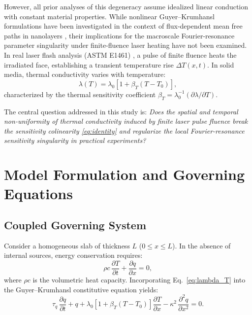 \documentclass[preprint,12pt,a4paper]{elsarticle}
\begin{document}
However, all prior analyses of this degeneracy assume idealized linear conduction with constant material properties. While nonlinear Guyer--Krumhansl formulations have been investigated in the context of flux-dependent mean free paths in nanolayers \cite{Sellitto2025}, their implications for the macroscale Fourier-resonance parameter singularity under finite-fluence laser heating have not been examined. In real laser flash analysis (ASTM E1461) \cite{ASTME1461,Cowan1963,CapeLehman1963}, a pulse of finite fluence heats the irradiated face, establishing a transient temperature rise $\Delta T(x,t)$. In solid media, thermal conductivity varies with temperature:
\begin{equation}
  \lambda(T) = \lambda_0 \left[1 + \beta_T (T - T_0)\right] ,
  \label{eq:lambda_T}
\end{equation}
characterized by the thermal sensitivity coefficient $\beta_T = \lambda_0^{-1} (\partial \lambda/\partial T)$.

The central question addressed in this study is: \emph{Does the spatial and temporal non-uniformity of thermal conductivity induced by finite laser pulse fluence break the sensitivity colinearity \eqref{eq:identity} and regularize the local Fourier-resonance sensitivity singularity in practical experiments?}

\section{Model Formulation and Governing Equations}

\subsection{Coupled Governing System}
Consider a homogeneous slab of thickness $L$ ($0 \le x \le L$). In the absence of internal sources, energy conservation requires:
\begin{equation}
  \rho c \, \frac{\partial T}{\partial t} + \frac{\partial q}{\partial x} = 0 ,
  \label{eq:energy}
\end{equation}
where $\rho c$ is the volumetric heat capacity. Incorporating Eq.~\eqref{eq:lambda_T} into the Guyer--Krumhansl constitutive equation yields:
\begin{equation}
  \tau_q \, \frac{\partial q}{\partial t} + q + \lambda_0\left[1 + \beta_T(T - T_0)\right]\frac{\partial T}{\partial x} - \kappa^2 \, \frac{\partial^2 q}{\partial x^2} = 0 .
  \label{eq:gk_nonlinear}
\end{equation}
\end{document}
